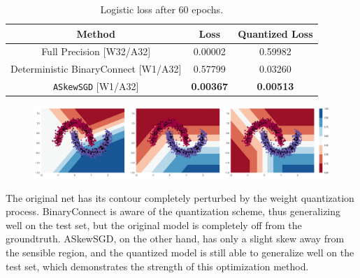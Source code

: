 \documentclass[10pt,a4paper]{article}
\begin{document}
\begin{table}[H]
  \caption{Logistic loss after 60 epochs.} \label{Tb:tb1}
  \begin{center}
    \begin{tabular}{ccc}
      \hline
      Method                               & Loss             & Quantized Loss   \\ \hline
      Full Precision [W32/A32]             & 0.00002          & 0.59982          \\ \hline
      Deterministic BinaryConnect [W1/A32] & 0.57799          & 0.03260          \\
      \texttt{ASkewSGD} [W1/A32]           & \textbf{0.00367} & \textbf{0.00513} \\ \hline
    \end{tabular}
  \end{center}
\end{table}
\begin{figure}[H]
  \centering
  \includegraphics[width=0.7\linewidth]{../exp/twomoonstest.png}
\end{figure}
The original net has its contour completely perturbed by the weight quantization process. BinaryConnect is aware of the quantization scheme, thus generalizing well on the test set, but the original model is completely off from the groundtruth. ASkewSGD, on the other hand, has only a slight skew away from the sensible region, and the quantized model is still able to generalize well on the test set, which demonstrates the strength of this optimization method.
\end{document}
